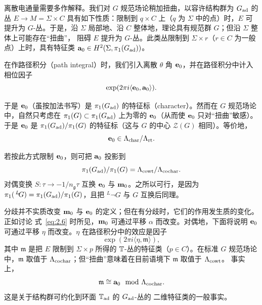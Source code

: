 离散电通量需要多作解释。我们对 $G$ 规范场论稍加扭曲，以容许结构群为 $G_{\rm ad}$ 的丛
$E\to M=\Sigma\times C$ 具有如下性质：限制到 $q\times C$ 上（$q$ 为 $\Sigma$ 中的点）时，$E$ 可
提升为 $G$-丛。于是，沿 $\Sigma$ 局部地、沿 $C$ 整体地，理论具有规范群 $G$；但沿 $\Sigma$ 整体上可能存在“扭曲”，
阻碍 $E$ 提升为 $G$-丛。此类丛限制到 $\Sigma\times r$（$r\in C$ 为一般点）上时，具有特征类
${\bf a}_0\in H^2(\Sigma,\pi_1(G_{\rm ad}))$。

在作路径积分（path integral）时，我们引入离散 $\theta$ 角 ${\bf e}_0$，并在路径积分中计入相位因子
\setcounter{equation}{3}
\begin{equation}\label{eq:4.4}
  \exp(2\pi i\langle {\bf e}_0,{\bf a}_0\rangle).
\end{equation}

于是 ${\bf e}_0$（虽按加法书写）是
$\pi_1(G_{\rm ad})$ 的特征标（character）。然而在 $G$ 规范场论中，自然只考虑在
$\pi_1(G)\subset
\pi_1(G_{\rm ad})$ 上为零的 ${\bf e}_0$（从而使 ${\bf e}_0$ 只对“扭曲”敏感）。于是 ${\bf e}_0$ 是 $\pi_1(G_{\rm
ad})/\pi_1(G)$ 的特征标（这与 $G$ 的中心 ${\mathcal
Z}(G)$ 相同）。等价地，
\setcounter{equation}{4}
\begin{equation}\label{eq:4.5}
  {\bf e}_0\in \Lambda_{\rm
char}/\Lambda_{\rm rt}.
\end{equation}

若按此方式限制
${\bf e}_0$，则可把 ${\bf a}_0$ 投影到
\setcounter{equation}{5}
\begin{equation}\label{eq:4.6}
  \pi_1(G_{\rm ad})/\pi_1(G)=\Lambda_{\rm cowt}/\Lambda_{\rm cochar}.
\end{equation}
对偶变换 $S:\tau\to -1/n_{\mathfrak g}\tau$ 互换
${\bf e}_0$ 与 ${\bf m}_0$。之所以可行，是因为
$\pi_1(\,^L\negthinspace G)=\pi_1(G_{\rm ad})/\pi_1(G)$，且把 $^L\neg G$ 与 $G$
互换后同理。

分歧并不实质改变 ${\bf
m}_0$ 与 ${\bf e}_0$ 的定义；但在有分歧时，它们的作用发生质的变化。正如讨论
式~\eqref{eq:2.6} 时所见，${\bf m}_0$ 可通过平移 $\alpha$ 而改变。对偶地，下面将说明
${\bf e}_0$ 可通过平移 $\eta$ 而改变。$\eta$ 在路径积分中的效应是因子
\setcounter{equation}{6}
\begin{equation}\label{eq:4.7}
  \exp(2\pi i\langle\eta,\mathfrak{m}\rangle),
\end{equation}
其中 $\mathfrak{m}$ 是把 $E$ 限制到 $\Sigma\times p$ 所得的
${\mathbb{T}}$-丛的特征类（$p\in C$）。在标准 $G$ 规范场论中，$\mathfrak{m}$ 取值于
$\Lambda_{\rm cochar}$；但“扭曲”意味着在目前语境下 $\mathfrak{m}$ 取值于 $\Lambda_{\rm cowt}$。
事实上，
\setcounter{equation}{7}
\begin{equation}\label{eq:4.8}
  \mathfrak{m} \cong {\bf a}_0~~{\rm
mod}~\Lambda_{\rm cochar}.
\end{equation}
这是关于结构群可约化到环面 ${\mathbb{T}}_{\rm ad}$ 的 $G_{\rm ad}$-丛的
二维特征类的一般事实。

